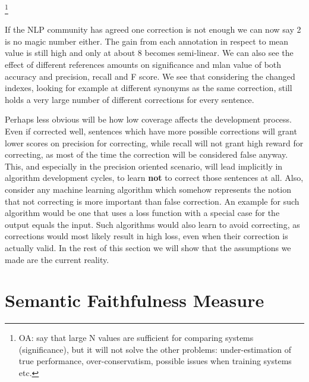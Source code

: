 \documentclass[letter,11pt]{article}
\newcommand{\oa}[1]{\footnote{\color{red}OA: #1}}
\begin{document}
{\oa{say that large N values are sufficient for comparing systems (significance),
  but it will not solve the other problems: under-estimation of true performance,
  over-conservatism, possible issues when training systems etc.}

If the NLP community has agreed one correction is not enough\cite{tetreault2008native}
we can now say 2 is no magic number either. The gain from each annotation in respect to mean value is still high and only at about 8 becomes semi-linear. We can also see the effect of different references amounts on significance and mlan value of both accuracy and precision, recall and F score.
We see that considering the changed indexes, looking for example at different synonyms as the same correction, still holds a very large number of different corrections for every sentence.

Perhaps less obvious will be how low coverage affects the development
process. Even if corrected well, sentences which have more possible
corrections will grant lower scores on precision for correcting, while recall will not grant high reward for correcting, as most of the time the correction will be considered false anyway. This, and especially in the precision oriented scenario, will lead implicitly in algorithm development cycles, to learn \textbf{not} to correct those sentences at all. Also, consider any machine learning algorithm which somehow represents the notion that not correcting is more important than false correction. An example for such algorithm would be one that uses a loss function with a special case for the output equals the input. Such algorithms would also learn to avoid correcting, as corrections would most likely result in high loss, even when their correction is actually valid.
In the rest of this section we will show that the assumptions we made are the current reality. 


\section{Semantic Faithfulness Measure}\label{sec:Semantics}



}
\end{document}
